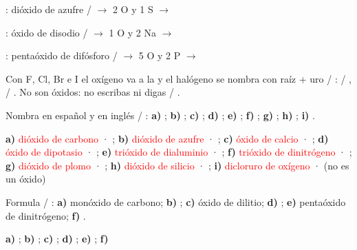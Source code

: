 \formulan
{} : dióxido de azufre /  \(\to\) 2 O y 1 S \(\to\) 

 : óxido de disodio /  \(\to\) 1 O y 2 Na \(\to\) 

 : pentaóxido de difósforo /  \(\to\) 5 O y 2 P \(\to\) 

\begin{marker}
     Con F, Cl, Br e I el oxígeno va a la  y el halógeno se nombra con raíz + uro / :   / ,   / . No son óxidos: no escribas  ni digas  / .
\end{marker}


\begin{exercise}
    Nombra en español y en inglés / : \textbf{a)} ; \textbf{b)} ; \textbf{c)} ; \textbf{d)} ; \textbf{e)} ; \textbf{f)} ; \textbf{g)} ; \textbf{h)} ; \textbf{i)} .
    \begin{solu}
        \textbf{a)} \textcolor{red}{dióxido de carbono} · \textcolor{red}{}; \textbf{b)} \textcolor{red}{dióxido de azufre} · \textcolor{red}{}; \textbf{c)} \textcolor{red}{óxido de calcio} · \textcolor{red}{}; \textbf{d)} \textcolor{red}{óxido de dipotasio} · \textcolor{red}{}; \textbf{e)} \textcolor{red}{trióxido de dialuminio} · \textcolor{red}{}; \textbf{f)} \textcolor{red}{trióxido de dinitrógeno} · \textcolor{red}{}; \textbf{g)} \textcolor{red}{dióxido de plomo} · \textcolor{red}{}; \textbf{h)} \textcolor{red}{dióxido de silicio} · \textcolor{red}{}; \textbf{i)} \textcolor{red}{dicloruro de oxígeno} · \textcolor{red}{} (no es un óxido)
    \end{solu}
\end{exercise}

\begin{exercise}
    Formula / : \textbf{a)} monóxido de carbono; \textbf{b)} ; \textbf{c)} óxido de dilitio; \textbf{d)} ; \textbf{e)} pentaóxido de dinitrógeno; \textbf{f)} .
    \begin{solu}
        \textbf{a)} \textcolor{red}{}; \textbf{b)} \textcolor{red}{}; \textbf{c)} \textcolor{red}{}; \textbf{d)} \textcolor{red}{}; \textbf{e)} \textcolor{red}{}; \textbf{f)} \textcolor{red}{}
    \end{solu}
\end{exercise}


